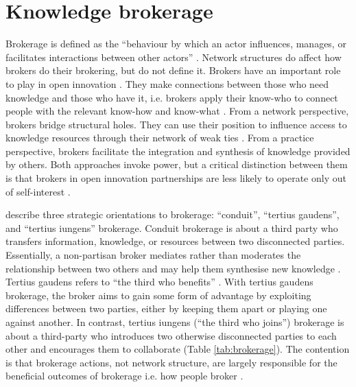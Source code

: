 \section{Knowledge brokerage} \label{sec:brokerage}

Brokerage is defined as the \enquote{behaviour by which an actor influences, manages, or facilitates interactions between other actors} \citep[][pg.~141]{obstfeld2014brokerage}. Network structures do affect how brokers do their brokering, but do not define it. Brokers have an important role to play in open innovation \citep{whelan2011creating,cococcioni2014exploring}. They make connections between those who need knowledge and those who have it, i.e. brokers apply their know-who to connect people with the relevant know-how and know-what \citep{davenport1998working}. From a network perspective, brokers bridge structural holes. They can use their position to influence access to knowledge resources through their network of weak ties \citep{burt1992structural,hanneman2005introduction,davis2010agency,simpson2011network,stovel2012brokerage}. From a practice perspective, brokers facilitate the integration and synthesis of knowledge provided by others. Both approaches invoke power, but a critical distinction between them is that brokers in open innovation partnerships are less likely to operate only out of self-interest \citep{lingo2010nexus,marabelli2016strategic}. \medskip

\citet{obstfeld2014brokerage} describe three strategic orientations to brokerage: \enquote{conduit}, \enquote{tertius gaudens}, and \enquote{tertius iungens} brokerage. Conduit brokerage is about a third party who transfers information, knowledge, or resources between two disconnected parties. Essentially, a non-partisan broker mediates rather than moderates the relationship between two others and may help them synthesise new knowledge \citep{simmel1950sociology,grosser2019measuring}. Tertius gaudens refers to \enquote{the third who benefits} \citep{simmel1950sociology}. With tertius gaudens brokerage, the broker aims to gain some form of advantage by exploiting differences between two parties, either by keeping them apart or playing one against another. In contrast, tertius iungens (\enquote{the third who joins}) brokerage is about a third-party who introduces two otherwise disconnected parties to each other and encourages them to collaborate (Table \ref{tab:brokerage}). The contention is that brokerage actions, not network structure, are largely responsible for the beneficial outcomes of brokerage i.e. how people broker \citep{grosser2019measuring}. \medskip

